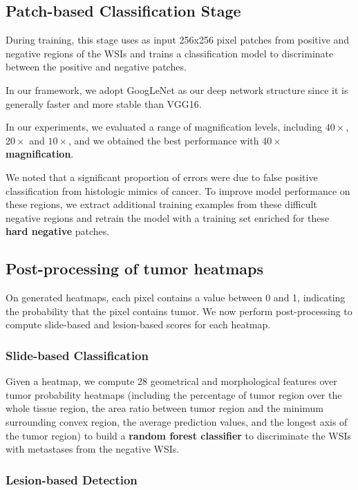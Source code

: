 \documentclass[a4paper,12pt]{article}
\begin{document}
\subsection{Patch-based Classification Stage}

During training, this stage uses as input 256x256 pixel patches from positive and negative regions of the WSIs and trains a classification model to discriminate between the positive and negative patches.

In our framework, we adopt GoogLeNet as our deep network structure since it is generally faster and more stable than VGG16.

In our experiments, we evaluated a range of magnification levels, including $40 \times$, $20 \times$ and $10 \times$, and we obtained the best performance with \textbf{$40 \times$ magnification}.

We noted that a significant proportion of errors were due to false positive classification from histologic mimics of cancer. To improve model performance on these regions, we extract additional training examples from these difficult negative regions and retrain the model with a training set enriched for these \textbf{hard negative} patches.

\subsection{Post-processing of tumor heatmaps}

On generated heatmaps, each pixel contains a value between 0 and 1, indicating the probability that the pixel contains tumor. We now perform post-processing to compute slide-based and lesion-based scores for each heatmap.

\subsubsection{Slide-based Classification}

Given a heatmap, we compute 28 geometrical and morphological features over tumor probability heatmaps (including the percentage of tumor region over the whole tissue region, the area ratio between tumor region and the minimum surrounding convex region, the average prediction values, and the longest axis of the tumor region) to build a \textbf{random forest classifier} to discriminate the WSIs with metastases from the negative WSIs.

\subsubsection{Lesion-based Detection}
\end{document}
